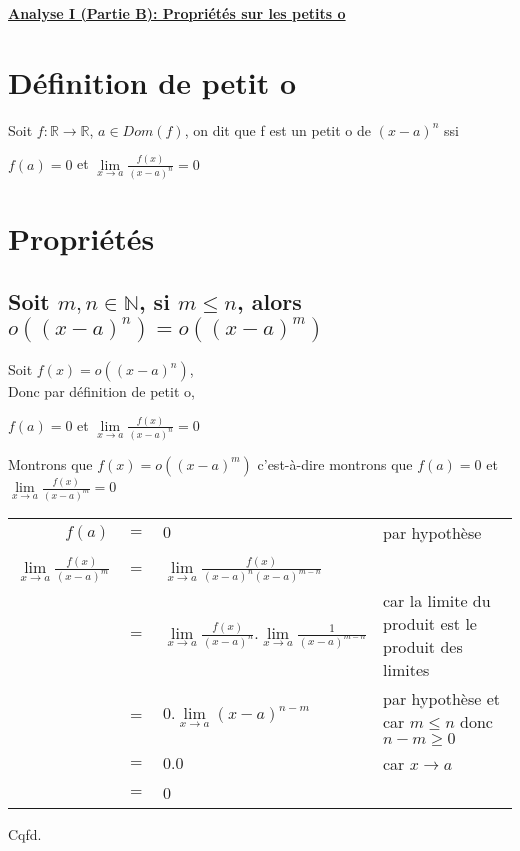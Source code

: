 \documentclass[a4paper,11pt]{report}
\begin{document}
\renewcommand{\labelitemi}{$\cdot$}
\begin{Large}\begin{center} 
   \underline{\textbf{Analyse I (Partie B): Propriétés sur les petits o}} 
\end{center}\end{Large}
\section{Définition de petit o}
Soit $f:\mathbb{R}\rightarrow\mathbb{R}$, $a\in Dom(f)$, on dit que f est un petit o de $(x-a)^n$ ssi\\
\begin{center}
	$f(a)=0$ et $\lim\limits_{x \rightarrow a}{\frac{f(x)}{(x-a)^n}}=0$
\end{center}

\section{Propriétés}
\subsection{Soit $m,n \in \mathbb{N}$, si $ m \le n$, alors $o((x-a)^n) = o((x-a)^m)$}
Soit $f(x) = o((x-a)^n)$,\\
Donc par définition de petit o,
\begin{center}
	$f(a) = 0$ et $\lim\limits_{x \rightarrow a}{\frac{f(x)}{(x-a)^n} = 0}$
\end{center}
Montrons que $f(x) = o((x-a)^m)$ c'est-à-dire montrons que $f(a) = 0$ et $\lim\limits_{x \rightarrow a}{\frac{f(x)}{(x-a)^m}} = 0$
\begin{center}
\begin{tabular}{rcll}
$f(a)$ & $=$ & $0$ & par hypothèse\\
&&& \\
$\lim\limits_{x \rightarrow a}{\frac{f(x)}{(x-a)^m}}$ & $=$ & $\lim\limits_{x \rightarrow a}{\frac{f(x)}{(x-a)^n (x-a)^{m-n}}}$ & \\
& $=$ & $\lim\limits_{x \rightarrow a}{\frac{f(x)}{(x-a)^n}}.\lim\limits_{x \rightarrow a}{\frac{1}{(x-a)^{m-n}}}$ & car la limite du produit est le produit des limites\\
& $=$ & $0.\lim\limits_{x \rightarrow a}{(x-a)^{n-m}}$ & par hypothèse et car $m \le n$ donc $n-m \ge 0$\\
& $=$ & $0.0$ & car $x \rightarrow a$ \\
& $=$ & 0 & \\
\end{tabular}
\end{center}
Cqfd.
\end{document}
